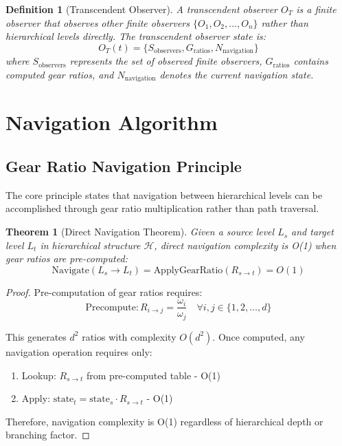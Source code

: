 \documentclass[12pt,a4paper]{article}
\newtheorem{theorem}{Theorem}
\newtheorem{definition}{Definition}
\begin{document}
\begin{definition}[Transcendent Observer]
A transcendent observer $O_T$ is a finite observer that observes other finite observers $\{O_1, O_2, \ldots, O_n\}$ rather than hierarchical levels directly. The transcendent observer state is:
\begin{equation}
O_T(t) = \{S_{\text{observers}}, G_{\text{ratios}}, N_{\text{navigation}}\}
\end{equation}
where $S_{\text{observers}}$ represents the set of observed finite observers, $G_{\text{ratios}}$ contains computed gear ratios, and $N_{\text{navigation}}$ denotes the current navigation state.
\end{definition}

\section{Navigation Algorithm}

\subsection{Gear Ratio Navigation Principle}

The core principle states that navigation between hierarchical levels can be accomplished through gear ratio multiplication rather than path traversal.

\begin{theorem}[Direct Navigation Theorem]
Given a source level $L_s$ and target level $L_t$ in hierarchical structure $\mathcal{H}$, direct navigation complexity is O(1) when gear ratios are pre-computed:
\begin{equation}
\text{Navigate}(L_s \to L_t) = \text{ApplyGearRatio}(R_{s \to t}) = O(1)
\end{equation}
\end{theorem}

\begin{proof}
Pre-computation of gear ratios requires:
\begin{equation}
\text{Precompute}: R_{i \to j} = \frac{\omega_i}{\omega_j} \quad \forall i,j \in \{1,2,\ldots,d\}
\end{equation}

This generates $d^2$ ratios with complexity $O(d^2)$. Once computed, any navigation operation requires only:
\begin{enumerate}
\item Lookup: $R_{s \to t}$ from pre-computed table - O(1)
\item Apply: $\text{state}_t = \text{state}_s \cdot R_{s \to t}$ - O(1)
\end{enumerate}

Therefore, navigation complexity is O(1) regardless of hierarchical depth or branching factor.
\end{proof}
\end{document}
